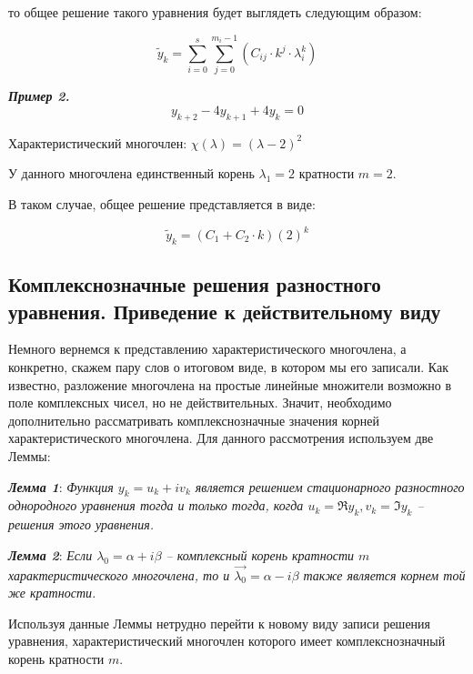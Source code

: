 \documentclass[10pt,a4paper]{article}
\begin{document}
	то общее решение такого уравнения будет выглядеть следующим образом:
	
	\begin{equation}
		\widetilde{y}_{k} = \sum\limits_{i = 0}^{s}\sum\limits_{j = 0}^
		{m_{i} - 1} \left(C_{ij}\cdot k^{j}\cdot\lambda_{i}^{k}\right)
	\end{equation}
	
	\textit{\textbf{Пример 2.}} \begin{equation}
		y_{k + 2} - 4y_{k + 1} + 4y_{k} = 0
	\end{equation}
	
	Характеристический многочлен:  $\chi\left(\lambda\right) = 
	\left(\lambda - 2\right)^{2}$
	
	У данного многочлена единственный корень $\lambda_{1}= 2$ кратности $m = 2$.
	
	В таком случае, общее решение представляется в виде:
	
	\begin{equation}
		\widetilde{y}_{k} = \left(C_{1} + C_{2}\cdot k\right)\left(2\right)^{k}
	\end{equation}
	
	\subsection{Комплекснозначные решения разностного уравнения. Приведение 
	к действительному виду}
	
	Немного вернемся к представлению характеристического многочлена, а 
	конкретно, скажем пару слов о итоговом виде, в котором мы его записали. 
	Как известно, разложение многочлена на простые линейные множители возможно в 
	поле комплексных чисел, но не действительных. Значит, необходимо 
	дополнительно рассматривать комплекснозначные значения корней 	
	характеристического многочлена. Для данного рассмотрения используем две 
	Леммы:
	
	\textit{\textbf{Лемма 1}}: \textit{Функция $y_{k} = u_{k} + iv_{k}$ 
	является решением стационарного разностного однородного уравнения тогда и 
	только тогда, когда $u_{k} = \Re y_{k}, v_{k} = \Im y_{k}$ -- решения этого
	уравнения.}
	
	\textit{\textbf{Лемма 2}}: \textit{Если $\lambda_{0} = \alpha + i\beta$ -- 
	комплексный корень кратности $m$ характеристического многочлена, то и 
	$\vec{\lambda_{0}} = \alpha - i\beta$ также является корнем той же 
	кратности.}
	
	Используя данные Леммы нетрудно перейти к новому виду записи решения 
	уравнения, характеристический многочлен которого имеет комплекснозначный 
	корень кратности $m$.
	
\end{document}
